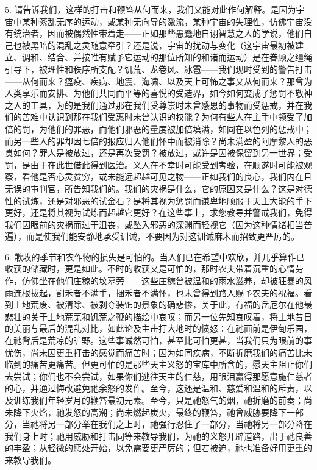 5. 请告诉我们，这样的打击和鞭笞从何而来，我们又能对此作何解释。是因为宇宙中某种紊乱无序的运动，或某种无向导的激流，某种宇宙的失理性，仿佛宇宙没有统治者，因而被偶然性带着走——正如那些愚蠢地自诩智慧之人的学说，他们自己也被黑暗的混乱之灵随意牵引？还是说，宇宙的扰动与变化（这宇宙最初被建立、调和、结合、并按唯有赋予它运动的那位所知的和诸而运动）是在眷顾之缰绳引导下，被理性和秩序所支配？饥荒、龙卷风、冰雹——我们现时受到的警告打击——从何而来？瘟疫、疾病、地震、海啸、以及天上可怖之事又从何而来？那曾为人类享乐而安排、为他们共同而平等的喜悦的受造界，如今如何变成了惩罚不敬神之人的工具，为的是我们通过那在我们受尊崇时未曾感恩的事物而受惩戒，并在我们的苦难中认识到那在我们受惠时未曾认识的权能？为何有些人在主手中领受了加倍的罚，为他们的罪恶，而他们邪恶的量度被加倍填满，如同在以色列的惩戒中；而另一些人的罪却因七倍的报应归入他们怀中而被消除？尚未满盈的阿摩黎人的恶贯如何？罪人是被放过，还是再次受罚？被放过，或许是因被保留到另一世界；受罚，是由于在此世借此得到医治。义人在不幸时可能受到考验，在顺遂时可能被观察，看他是否心灵贫穷，或未能远超越可见之物——正如我们的良心，我们内在且无误的审判官，所告知我们的。我们的灾祸是什么，它的原因又是什么？这是对德性的试炼，还是对邪恶的试金石？是将其视为惩罚而谦卑地顺服于天主大能的手下更好，还是将其视为试炼而超越它更好？在这些事上，求您教导并警戒我们，免得我们因眼前的灾祸而过于沮丧，或坠入邪恶的深渊而轻视它（因为这种情绪相当普遍），而是使我们能安静地承受训诫，不要因为对这训诫麻木而招致更严厉的。\par

6. 歉收的季节和农作物的损失是可怕的。当人们已在希望中欢欣，并几乎算作已收获的储藏时，更是如此。不时的收获又是可怕的，那时农夫带着沉重的心情劳作，仿佛坐在他们庄稼的坟墓旁——这些庄稼曾被温和的雨水滋养，却被狂暴的风雨连根拔起，割禾者不满手，捆禾者不满怀，也未曾得到路人赐予农夫的祝福。看到土地荒废、被清除、被剥夺装饰的景象的确悲惨，关于此，有福的岳厄尔在他最悲壮的关于土地荒芜和饥荒之鞭的描绘中哀叹；而另一位先知哀叹着，将土地昔日的美丽与最后的混乱对比，如此论及主击打大地时的愤怒：在祂面前是伊甸乐园，在祂背后是荒凉的旷野。这些事诚然可怕，甚至比可怕更甚，当我们只为眼前的事忧伤，尚未因更重打击的感觉而痛苦时；因为如同疾病，不断折磨我们的痛苦比未临到的痛苦更痛苦。但更可怕的是那些天主义怒的宝库中所含的，愿天主阻止你们去尝试；你们也不会尝试，如果你们逃往天主的仁慈，用眼泪赢得那愿意施仁慈者的心，并通过悔改避免祂余怒的发作。至今，这还是温和、慈爱和温和的斥责，以及训练我们年轻岁月的鞭笞最初元素。至今，只是祂怒气的烟，祂折磨的前奏；尚未降下火焰，祂发怒的高潮；尚未燃起炭火，最终的鞭笞，祂曾威胁要降下一部分，当祂将另一部分举在我们之上时，祂强行忍住了一部分，当祂将另一部分降在我们身上时；祂用威胁和打击同等来教导我们，为祂的义怒开辟道路，出于祂良善的丰盈；从轻微的惩处开始，以免需要更严厉的；但若被迫，祂也准备好用更重的来教导我们。\par


